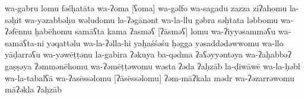 \begin{transliteration}
    wa-gabru
    lomu fəśḥatāta wa-ʔoma [ʕoma] wa-gəlfo wa-sagadu zazza ziʔahomu
    la-səḥit wa-yəzabbəḥu wəludomu la-ʔəgānənt wa-la-llu gəbra
    səḥtata ləbbomu
    wa-ʔəfēnnu ḫabēhomu samāʕta kama
    ʔasməʕ [ʔāsməʕ] lomu wa-ʔiyyəsamməʕu  wa-samāʕta-ni yəqattəlu wa-la-ʔəlla-hi
    yaḫaśśəśu ḥəgga yəsaddədəwwomu wa-llo yāḍarrəʕu wa-yəwēṭṭənu la-gabira
    ʔəkuya ba-qədma ʔaʕəyyəntəya
    wa-ʔaḫabbəʔ gaṣṣəya
    ʔəmmənēhomu wa-ʔəmēṭṭəwomu wəsta ʔəda ʔaḥzāb la-ḍiwāwē
    wa-la-ḥəbl wa-la-tabalʕā wa-ʔasēssəlomu [ʔāsēssəlomu] ʔəm-māʔkala mədr
    wa-ʔəzarrəwomu māʔəkla ʔaḥzāb

\end{transliteration}
